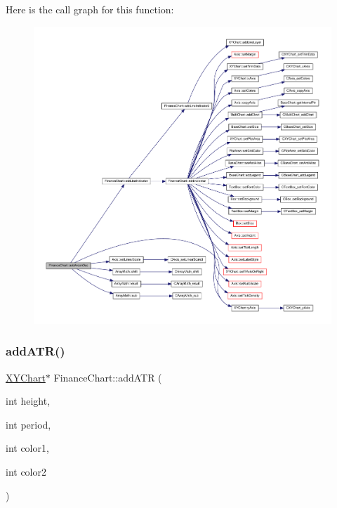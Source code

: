 Here is the call graph for this function\+:
\nopagebreak
\begin{figure}[H]
\begin{center}
\leavevmode
\includegraphics[width=350pt]{class_finance_chart_a259aa83c1222608df3f6d95410a97ea4_cgraph}
\end{center}
\end{figure}
\mbox{\label{class_finance_chart_a0eaad6d3d543f42315791022bde7bbb3}} 
\subsubsection{\texorpdfstring{add\+A\+T\+R()}{addATR()}}
{\footnotesize\ttfamily \hyperlink{class_x_y_chart}{X\+Y\+Chart}$\ast$ Finance\+Chart\+::add\+A\+TR (\begin{DoxyParamCaption}\item[{int}]{height,  }\item[{int}]{period,  }\item[{int}]{color1,  }\item[{int}]{color2 }\end{DoxyParamCaption})\hspace{0.3cm}{\ttfamily [inline]}}




